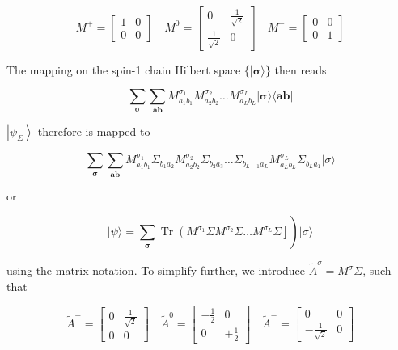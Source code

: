 \documentclass[12pt]{article}
\begin{document}
\[
M^{+}=\left[\begin{array}{ll}
1 & 0  \tag{85}\\
0 & 0
\end{array}\right] \quad M^{0}=\left[\begin{array}{cc}
0 & \frac{1}{\sqrt{2}} \\
\frac{1}{\sqrt{2}} & 0
\end{array}\right] \quad M^{-}=\left[\begin{array}{ll}
0 & 0 \\
0 & 1
\end{array}\right]
\]

The mapping on the spin-1 chain Hilbert space $\{|\boldsymbol{\sigma}\rangle\}$ then reads


\begin{equation*}
\sum_{\boldsymbol{\sigma}} \sum_{\mathbf{a b}} M_{a_{1} b_{1}}^{\sigma_{1}} M_{a_{2} b_{2}}^{\sigma_{2}} \ldots M_{a_{L} b_{L}}^{\sigma_{L}}|\boldsymbol{\sigma}\rangle\langle\mathbf{a b}| \tag{86}
\end{equation*}


$\left|\psi_{\Sigma}\right\rangle$ therefore is mapped to


\begin{equation*}
\sum_{\boldsymbol{\sigma}} \sum_{\mathbf{a b}} M_{a_{1} b_{1}}^{\sigma_{1}} \Sigma_{b_{1} a_{2}} M_{a_{2} b_{2}}^{\sigma_{2}} \Sigma_{b_{2} a_{3}} \ldots \Sigma_{b_{L-1} a_{L}} M_{a_{L} b_{L}}^{\sigma_{L}} \Sigma_{b_{L} a_{1}}|\sigma\rangle \tag{87}
\end{equation*}


or


\begin{equation*}
\left.|\psi\rangle=\sum_{\boldsymbol{\sigma}} \operatorname{Tr}\left(M^{\sigma_{1}} \Sigma M^{\sigma_{2}} \Sigma \ldots M^{\sigma_{L}} \Sigma\right]\right)|\sigma\rangle \tag{88}
\end{equation*}


using the matrix notation. To simplify further, we introduce $\tilde{A}^{\sigma}=M^{\sigma} \Sigma$, such that

\[
\tilde{A}^{+}=\left[\begin{array}{cc}
0 & \frac{1}{\sqrt{2}}  \tag{89}\\
0 & 0
\end{array}\right] \quad \tilde{A}^{0}=\left[\begin{array}{cc}
-\frac{1}{2} & 0 \\
0 & +\frac{1}{2}
\end{array}\right] \quad \tilde{A}^{-}=\left[\begin{array}{cc}
0 & 0 \\
-\frac{1}{\sqrt{2}} & 0
\end{array}\right]
\]
\end{document}
